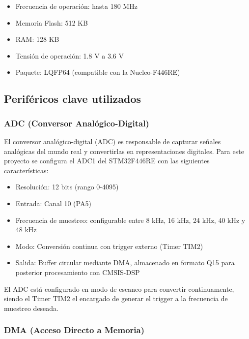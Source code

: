 \documentclass[12pt]{article}
\begin{document}
			\begin{itemize}
				\item Frecuencia de operación: hasta 180 MHz
				
				\item Memoria Flash: 512 KB
				
				\item RAM: 128 KB 
				
				\item Tensión de operación: 1.8 V a 3.6 V
				
				\item Paquete: LQFP64 (compatible con la Nucleo-F446RE)
			\end{itemize}
	
		\subsection{Periféricos clave utilizados}

			\subsubsection{ADC (Conversor Analógico-Digital)}

				El conversor analógico-digital (ADC) es responsable de capturar señales analógicas del mundo real y convertirlas en representaciones digitales. Para este proyecto se configura el ADC1 del STM32F446RE con las siguientes características:

				\begin{itemize}
					\item Resolución: 12 bits (rango 0-4095)
					\item Entrada: Canal 10 (PA5)
					\item Frecuencia de muestreo: configurable entre 8 kHz, 16 kHz, 24 kHz, 40 kHz y 48 kHz
					\item Modo: Conversión continua con trigger externo (Timer TIM2)
					\item Salida: Buffer circular mediante DMA, almacenado en formato Q15 para posterior procesamiento con CMSIS-DSP
				\end{itemize}

				El ADC está configurado en modo de escaneo para convertir continuamente, siendo el Timer TIM2 el encargado de generar el trigger a la frecuencia de muestreo deseada.

			\subsubsection{DMA (Acceso Directo a Memoria)}
\end{document}
